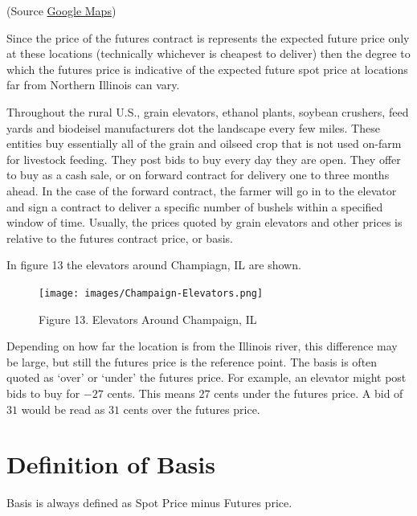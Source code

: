 \documentclass[
  letterpaper,
  DIV=11,
  numbers=noendperiod]{scrreprt}
\begin{document}
(Source
\href{https://www.google.com/maps/place/Burns+Harbor,+IN/@41.740398,-87.7248706,10.5z/data=!4m5!3m4!1s0x8811bc3712ab828d:0x98301a46014d10b5!8m2!3d41.6258708!4d-87.1333676}{Google
Maps})

Since the price of the futures contract is represents the expected
future price only at these locations (technically whichever is cheapest
to deliver) then the degree to which the futures price is indicative of
the expected future spot price at locations far from Northern Illinois
can vary.

Throughout the rural U.S., grain elevators, ethanol plants, soybean
crushers, feed yards and biodeisel manufacturers dot the landscape every
few miles. These entities buy essentially all of the grain and oilseed
crop that is not used on-farm for livestock feeding. They post bids to
buy every day they are open. They offer to buy as a cash sale, or on
forward contract for delivery one to three months ahead. In the case of
the forward contract, the farmer will go in to the elevator and sign a
contract to deliver a specific number of bushels within a specified
window of time. Usually, the prices quoted by grain elevators and other
prices is relative to the futures contract price, or basis.

In figure 13 the elevators around Champiagn, IL are shown.

\begin{figure}

{\centering \texttt{[image: images/Champaign-Elevators.png]}

}

\caption{Figure 13. Elevators Around Champaign, IL}

\end{figure}

Depending on how far the location is from the Illinois river, this
difference may be large, but still the futures price is the reference
point. The basis is often quoted as `over' or `under' the futures price.
For example, an elevator might post bids to buy for \(-27\) cents. This
means \(27\) cents under the futures price. A bid of \(31\) would be
read as \(31\) cents over the futures price.

\hypertarget{definition-of-basis}{%
\section{Definition of Basis}\label{definition-of-basis}}

Basis is always defined as Spot Price minus Futures price.
\end{document}
